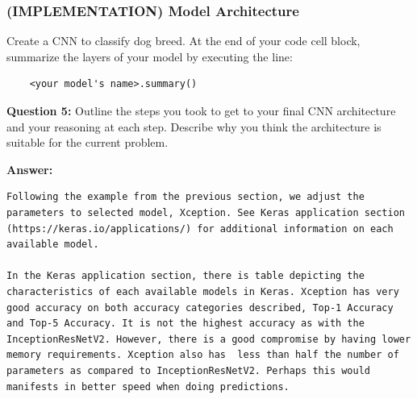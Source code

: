 \documentclass[11pt]{article}
\begin{document}
    \hypertarget{implementation-model-architecture}{%
\subsubsection{(IMPLEMENTATION) Model
Architecture}\label{implementation-model-architecture}}

Create a CNN to classify dog breed. At the end of your code cell block,
summarize the layers of your model by executing the line:

\begin{verbatim}
    <your model's name>.summary()
\end{verbatim}

\textbf{Question 5:} Outline the steps you took to get to your final CNN
architecture and your reasoning at each step. Describe why you think the
architecture is suitable for the current problem.

\textbf{Answer:}

\begin{verbatim}
Following the example from the previous section, we adjust the parameters to selected model, Xception. See Keras application section (https://keras.io/applications/) for additional information on each available model.

In the Keras application section, there is table depicting the characteristics of each available models in Keras. Xception has very good accuracy on both accuracy categories described, Top-1 Accuracy and Top-5 Accuracy. It is not the highest accuracy as with the InceptionResNetV2. However, there is a good compromise by having lower memory requirements. Xception also has  less than half the number of parameters as compared to InceptionResNetV2. Perhaps this would manifests in better speed when doing predictions.
\end{verbatim}
\end{document}
